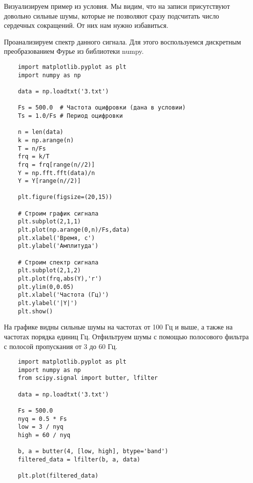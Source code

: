 \solutionSection

Визуализируем пример из условия. Мы видим, что на записи присутствуют довольно сильные шумы, которые не позволяют сразу подсчитать число сердечных сокращений. От них нам нужно избавиться.


Проанализируем спектр данного сигнала. Для этого воспользуемся дискретным преобразованием Фурье из библиотеки numpy.


\begin{verbatim}
    import matplotlib.pyplot as plt
    import numpy as np

    data = np.loadtxt('3.txt')

    Fs = 500.0  # Частота оцифровки (дана в условии)
    Ts = 1.0/Fs # Период оцифровки

    n = len(data)
    k = np.arange(n)
    T = n/Fs
    frq = k/T
    frq = frq[range(n//2)]
    Y = np.fft.fft(data)/n
    Y = Y[range(n//2)]

    plt.figure(figsize=(20,15))

    # Строим график сигнала
    plt.subplot(2,1,1)
    plt.plot(np.arange(0,n)/Fs,data)
    plt.xlabel('Время, с')
    plt.ylabel('Амплитуда')

    # Строим спектр сигнала
    plt.subplot(2,1,2)
    plt.plot(frq,abs(Y),'r')
    plt.ylim(0,0.05)
    plt.xlabel('Частота (Гц)')
    plt.ylabel('|Y|')
    plt.show()
\end{verbatim}

На графике видны сильные шумы на частотах от 100 Гц и выше, а также на частотах порядка единиц Гц. Отфильтруем шумы с помощью полосового фильтра с полосой пропускания от 3 до 60 Гц.

\begin{verbatim}
    import matplotlib.pyplot as plt
    import numpy as np
    from scipy.signal import butter, lfilter

    data = np.loadtxt('3.txt')

    Fs = 500.0
    nyq = 0.5 * Fs
    low = 3 / nyq
    high = 60 / nyq

    b, a = butter(4, [low, high], btype='band')
    filtered_data = lfilter(b, a, data)

    plt.plot(filtered_data)
\end{verbatim}

